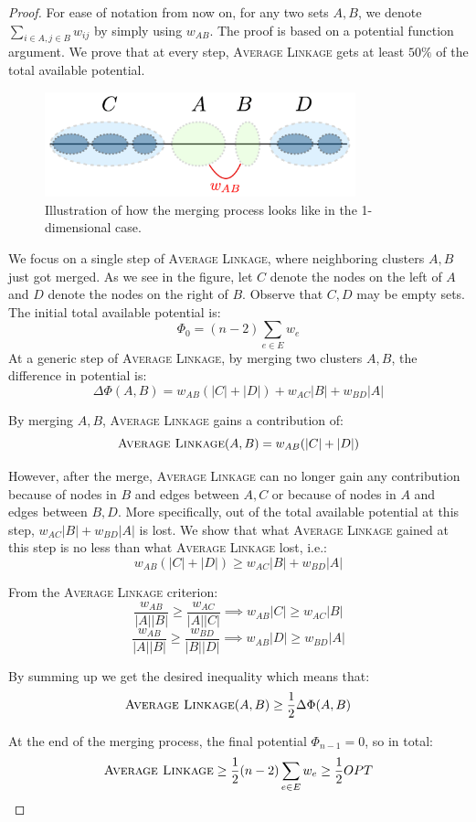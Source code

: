 \documentclass[twoside]{article}
\begin{document}
\begin{proof}
	For ease of notation from now on, for any two sets $A,B$, we denote $\sum_{i\in A,j\in B}w_{ij}$ by simply using $w_{AB}$.
	The proof is based on a potential function argument. We prove that at every step, \textsc{Average Linkage} gets at least $50\%$ of the total available potential.
	
	\begin{figure}[h!]
		\centering
		\includegraphics[width=9cm]{merging}
		\caption{Illustration of how the merging process looks like in the 1-dimensional case.}
	\end{figure}
	
	We focus on a single step of \textsc{Average Linkage}, where neighboring clusters $A,B$ just got merged. As we see in the figure, let $C$ denote the nodes on the left of $A$ and $D$ denote the nodes on the right of $B$. Observe that $C,D$ may be empty sets. The initial total available potential is:
	\[
	\Phi_0 = (n-2)\sum_{e\in E}w_e
	\]
	At a generic step of \textsc{Average Linkage}, by merging two clusters $A,B$, the difference in potential is:
	\[
	\Delta\Phi(A,B) = w_{AB}(|C|+|D|) + w_{AC}|B|+ w_{BD}|A| 
	\]
	
	By merging $A,B$, \textsc{Average Linkage} gains a contribution of:
	\[
	\textsc{Average Linkage}(A,B) = w_{AB}(|C|+|D|)
	\]
	
	However, after the merge, \textsc{Average Linkage} can no longer gain any contribution because of nodes in $B$ and edges between $A,C$ or because of nodes in $A$ and edges between $B,D$. More specifically, out of the total available potential at this step, $w_{AC}|B| + w_{BD}|A|$ is lost. We show that what \textsc{Average Linkage} gained at this step is no less than what \textsc{Average Linkage} lost, i.e.:
	\[
	w_{AB}(|C|+|D|) \ge w_{AC}|B| + w_{BD}|A|
	\]
	
	From the \textsc{Average Linkage} criterion:
	\[
	\dfrac{w_{AB}}{|A||B|}\ge \dfrac{w_{AC}}{|A||C|}\implies w_{AB}|C| \ge w_{AC}|B|
	\]
	\[
	\dfrac{w_{AB}}{|A||B|}\ge \dfrac{w_{BD}}{|B||D|}\implies w_{AB}|D| \ge w_{BD}|A|
	\]
	
	By summing up we get the desired inequality which means that:
	\[
	\textsc{Average Linkage}(A,B)\ge \dfrac12 \Delta\Phi(A,B)
	\]
	
	At the end of the merging process, the final potential $\Phi_{n-1} = 0$, so in total:
	\[
	\textsc{Average Linkage}\ge \dfrac12 (n-2)\sum_{e\in E}w_e\ge \dfrac12 OPT
	\]
	
\end{proof}
\end{document}
